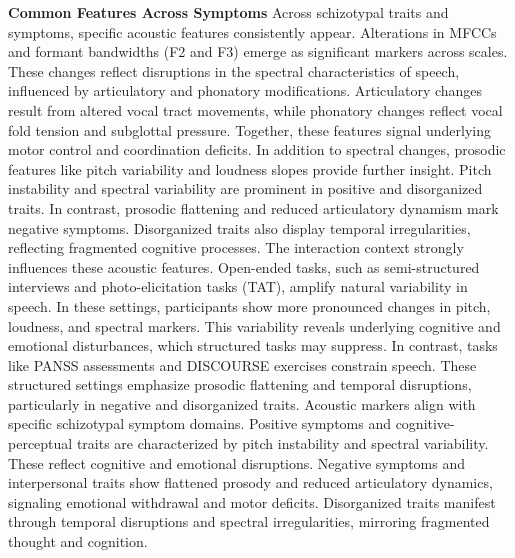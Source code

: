 \documentclass[9pt,a4paper]{rho-class/rho}
\begin{document}
\begin{table*}[htbp]
\begin{tabularx}{\textwidth}{>{\raggedright\arraybackslash}X | l | c | c | c | c | c | c | c | c | c | c }
\bottomrule
\end{tabularx}
\caption{Root Mean Square Error (RMSE↓) results for different models and interaction types. The table groups models into Speech (GRU), Language (GRU), and Multimodal models (TCF). The interaction types include PANSS (Positive, Negative), MSS with Cognitive-Perceptual (CP), Interpersonal (IP), and Disorganization (DO), and O-LIFE with Unusual Experiences (UE), Introvertive Anhedonia (IA), Cognitive Disorganization (CD), and Impulsive Nonconformity (IN). Bold values represent the lowest RMSE in each column.}
\end{table*}



\textbf{Common Features Across Symptoms} Across schizotypal traits and symptoms, specific acoustic features consistently appear. Alterations in MFCCs and formant bandwidths (F2 and F3) emerge as significant markers across scales. These changes reflect disruptions in the spectral characteristics of speech, influenced by articulatory and phonatory modifications. Articulatory changes result from altered vocal tract movements, while phonatory changes reflect vocal fold tension and subglottal pressure. Together, these features signal underlying motor control and coordination deficits.
In addition to spectral changes, prosodic features like pitch variability and loudness slopes provide further insight. Pitch instability and spectral variability are prominent in positive and disorganized traits. In contrast, prosodic flattening and reduced articulatory dynamism mark negative symptoms. Disorganized traits also display temporal irregularities, reflecting fragmented cognitive processes.
The interaction context strongly influences these acoustic features. Open-ended tasks, such as semi-structured interviews and photo-elicitation tasks (TAT), amplify natural variability in speech. In these settings, participants show more pronounced changes in pitch, loudness, and spectral markers. This variability reveals underlying cognitive and emotional disturbances, which structured tasks may suppress. In contrast, tasks like PANSS assessments and DISCOURSE exercises constrain speech. These structured settings emphasize prosodic flattening and temporal disruptions, particularly in negative and disorganized traits.
Acoustic markers align with specific schizotypal symptom domains. Positive symptoms and cognitive-perceptual traits are characterized by pitch instability and spectral variability. These reflect cognitive and emotional disruptions. Negative symptoms and interpersonal traits show flattened prosody and reduced articulatory dynamics, signaling emotional withdrawal and motor deficits. Disorganized traits manifest through temporal disruptions and spectral irregularities, mirroring fragmented thought and cognition.
\end{document}
